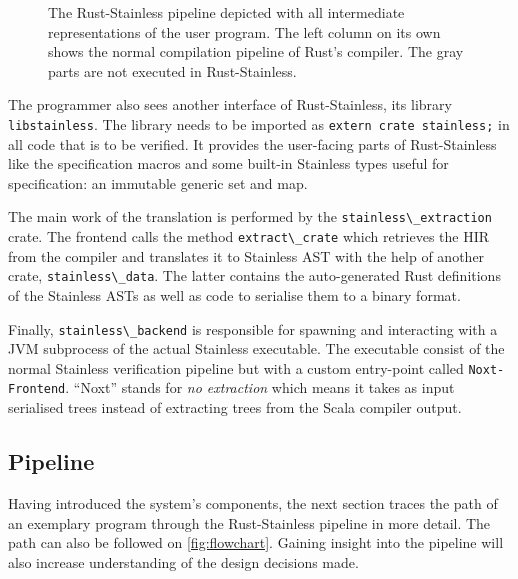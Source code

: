 \begin{figure}
  \begin{center}
  
  \caption{
    The Rust-Stainless pipeline depicted with all intermediate representations
    of the user program. The left column on its own shows the normal compilation
    pipeline of Rust's compiler. The gray parts are not executed in Rust-Stainless.
  }
  \label{fig:flowchart}
  \end{center}
\end{figure}

The programmer also sees another interface of Rust-Stainless, its
library \lstinline!libstainless!. The library needs to be
imported as \passthrough{\lstinline!extern crate stainless;!} in all
code that is to be verified. It provides the user-facing parts of
Rust-Stainless like the specification macros and some built-in Stainless
types useful for specification: an immutable generic set and map.

The main work of the translation is performed by the
\passthrough{\lstinline!stainless\_extraction!} crate. The frontend
calls the method \passthrough{\lstinline!extract\_crate!} which
retrieves the HIR from the compiler and translates it to Stainless AST
with the help of another crate,
\passthrough{\lstinline!stainless\_data!}. The latter contains the
auto-generated Rust definitions of the Stainless ASTs as well as code to
serialise them to a binary format.

Finally, \passthrough{\lstinline!stainless\_backend!} is responsible for
spawning and interacting with a JVM subprocess of the actual Stainless
executable. The executable consist of the normal Stainless verification
pipeline but with a custom entry-point called
\passthrough{\lstinline!Noxt-Frontend!}. ``Noxt'' stands for \emph{no
extraction} which means it takes as input serialised trees instead of
extracting trees from the Scala compiler output.

\subsection{Pipeline}
\label{sec:pipeline}

Having introduced the system's components, the next section traces the path of
an exemplary program through the Rust-Stainless pipeline in more detail. The
path can also be followed on  \autoref{fig:flowchart}. Gaining insight into the
pipeline will also increase understanding of the design decisions made.

